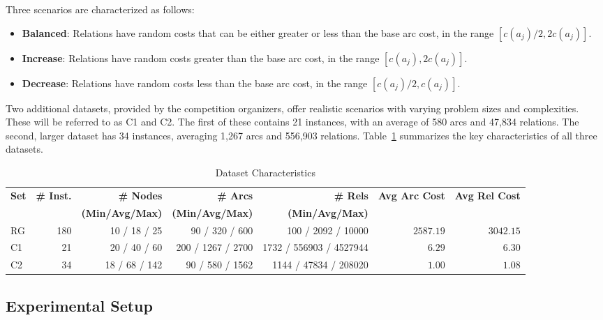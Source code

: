 \documentclass[twocolumn]{article} %
\begin{document}
Three scenarios are characterized as follows:
\begin{itemize}
    \item \textbf{Balanced}: Relations have random costs that can be either greater or less than the base arc cost, in the range $[c(a_j)/2, 2c(a_j)]$.
    \item \textbf{Increase}: Relations have random costs greater than the base arc cost, in the range $[c(a_j), 2c(a_j)]$.
    \item \textbf{Decrease}: Relations have random costs less than the base arc cost, in the range $[c(a_j)/2, c(a_j)]$.
\end{itemize}

Two additional datasets, provided by the competition organizers, offer realistic scenarios with varying problem sizes and complexities. These will be referred to as C1 and C2. The first of these contains 21 instances, with an average of 580 arcs and 47,834 relations. The second, larger dataset has 34 instances, averaging 1,267 arcs and 556,903 relations. Table~\ref{tab:dataset_characteristics} summarizes the key characteristics of all three datasets.

\begin{table}[t]
    \setlength{\belowcaptionskip}{8pt}
    \caption{Dataset Characteristics}
    \label{tab:dataset_characteristics}
    \centering
    \begin{tabular}{lrrrrrr}
        \toprule
        \textbf{Set} & \textbf{\# Inst.} & \textbf{\# Nodes} & \textbf{\# Arcs} & \textbf{\# Rels} & \textbf{Avg Arc Cost} & \textbf{Avg Rel Cost} \\
        & & \textbf{(Min/Avg/Max)} & \textbf{(Min/Avg/Max)} & \textbf{(Min/Avg/Max)} & & \\
        \midrule
        RG & 180 & 10 / 18 / 25 & 90 / 320 / 600 & 100 / 2092 / 10000 & $2587.19$ & $3042.15$ \\
        C1 & 21 & 20 / 40 / 60 & 200 / 1267 / 2700 & 1732 / 556903 / 4527944 & $6.29$ & $6.30$ \\
        C2 & 34 & 18 / 68 / 142 & 90 / 580 / 1562 & 1144 / 47834 / 208020 & $1.00$ & $1.08$ \\
        \bottomrule
    \end{tabular}
\end{table}

\subsection{Experimental Setup}
\end{document}
